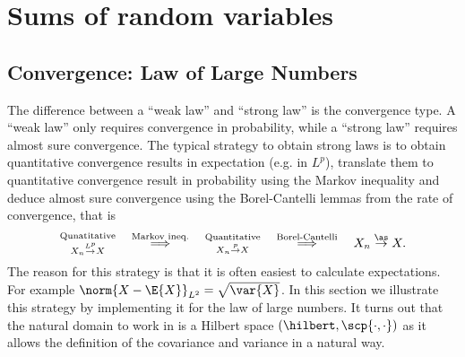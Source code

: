 \chapter{Sums of random variables}

\section{Convergence: Law of Large Numbers}
\label{sec: law of large numbers}

The difference between a ``weak law'' and ``strong law'' is the convergence type.
A ``weak law'' only requires convergence in probability, while a ``strong law''
requires almost sure convergence. The typical strategy to obtain strong laws is
to obtain quantitative convergence results in expectation (e.g. in \(L^p\)), translate them
to quantitative convergence result in probability using the Markov inequality
and deduce almost sure convergence using the Borel-Cantelli lemmas from
the rate of convergence, that is
\[\begin{aligned}
    \substack{\text{Qunatitative}\\ X_n \overset{L^p}\to X } \quad
    \overset{\text{Markov ineq.}}\implies \quad \substack{\text{Quantitative}\\ X_n \overset{p}\to X}\quad
    \overset{\text{Borel-Cantelli}}\implies \quad X_n \overset{\as}\to X.
\end{aligned}
\]
The reason for this strategy is that it is often easiest to calculate
expectations.  For example \(\norm{X - \E{X}}_{L^2} = \sqrt{\var{X}}\). 
In this section we illustrate this strategy by implementing it for the
law of large numbers. It turns out that the natural domain to work in
is a Hilbert space \((\hilbert, \scp{\cdot, \cdot})\) as it allows
the definition of the covariance and variance in a natural way.

